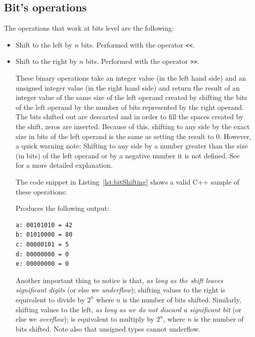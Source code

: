\subsection{Bit's operations}

The operations that work at bits level are the following:
\begin{itemize}
\item Shift to the left by $n$ bits. Performed with the operator \texttt{<<}.
\item Shift to the right by $n$ bits. Performed with the operator \texttt{>>}.

These binary operations take an integer value (in the left hand side) and an unsigned integer value (in the right hand side) and return the result of an integer value of the same size of the left operand created by shifting the bits of the left operand by the number of bits represented by the right operand.
The bits shifted out are descarted and in order to fill the spaces created by the shift, zeros are inserted.
Because of this, shifting to any side by the exact size in bits of the left operand is the same as setting the result to 0.
However, a quick warning note: Shifting to any side by a number greater than the size (in bits) of the left operand or by a negative number it is not defined. See~\cite{INT34Cpp} for a more detailed explanation.

The code snippet in Listing~\ref{lst:bitShifting} shows a valid C++ sample of these operations:

{\centering
\begin{minipage}{\linewidth}
\end{minipage}
\par
}

Produces the following output:

\begin{verbatim}
a: 00101010 = 42
b: 01010000 = 80
c: 00000101 = 5
d: 00000000 = 0
e: 00000000 = 0
\end{verbatim} 

Another important thing to notice is that, \emph{as long as the shift leaves significant digits} (or else we \emph{underflow}); shifting values to the right is equivalent to divide by $2^n$ where $n$ is the number of bits shifted.
Similarly, shifting values to the left, \emph{as long as we do not discard a significant bit} (or else we \emph{overflow}); is equivalent to multiply by $2^n$, where $n$ is the number of bits shifted.
Note also that unsigned types cannot underflow.


\end{itemize}
